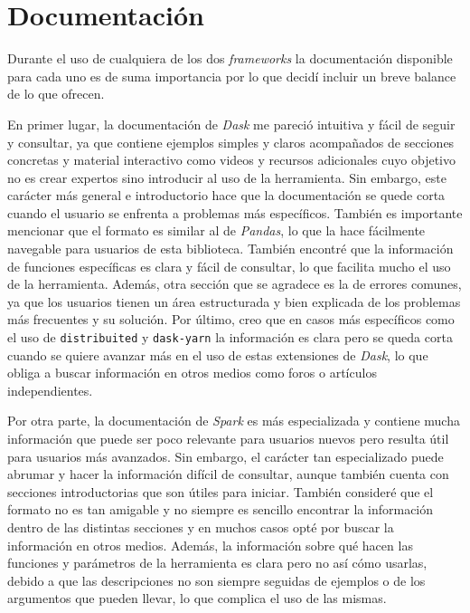 \section{Documentación}

Durante el uso de cualquiera de los dos \textit{frameworks} la documentación disponible para cada uno es de suma importancia por lo que decidí incluir un breve balance de lo que ofrecen.

En primer lugar, la documentación de \textit{Dask} me pareció intuitiva y fácil de seguir y consultar, ya que contiene ejemplos simples y claros acompañados de secciones concretas y material interactivo como videos y recursos adicionales cuyo objetivo no es crear expertos sino introducir al uso de la herramienta. Sin embargo, este carácter más general e introductorio hace que la documentación se quede corta cuando el usuario se enfrenta a problemas más específicos. También es importante mencionar que el formato es similar al de \textit{Pandas}, lo que la hace fácilmente navegable para usuarios de esta biblioteca. También encontré que la información de funciones específicas es clara y fácil de consultar, lo que facilita mucho el uso de la herramienta. Además, otra sección que se agradece es la de errores comunes, ya que los usuarios tienen un área estructurada y bien explicada de los problemas más frecuentes y su solución. Por último, creo que en casos más específicos como el uso de \texttt{distribuited} y \texttt{dask-yarn} la información es clara pero se queda corta cuando se quiere avanzar más en el uso de estas extensiones de \textit{Dask}, lo que obliga a buscar información en otros medios como foros o artículos independientes.

Por otra parte, la documentación de \textit{Spark} es más especializada y contiene mucha información que puede ser poco relevante para usuarios nuevos pero resulta útil para usuarios más avanzados. Sin embargo, el carácter tan especializado puede abrumar y hacer la información difícil de consultar, aunque también cuenta con secciones introductorias que son útiles para iniciar. También consideré que el formato no es tan amigable y no siempre es sencillo encontrar la información dentro de las distintas secciones y en muchos casos opté por buscar la información en otros medios. Además, la información sobre qué hacen las funciones y parámetros de la herramienta es clara pero no así cómo usarlas, debido a que las descripciones no son siempre seguidas de ejemplos o de los argumentos que pueden llevar, lo que complica el uso de las mismas.

